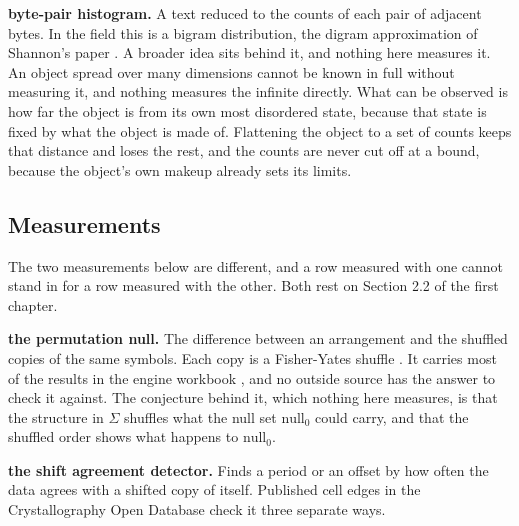 \noindent\textbf{byte-pair histogram.} A text reduced to the counts of each pair of adjacent bytes. In the field this is a bigram distribution, the digram approximation of Shannon's paper \cite{src:Shannon}. A broader idea sits behind it, and nothing here measures it. An object spread over many dimensions cannot be known in full without measuring it, and nothing measures the infinite directly. What can be observed is how far the object is from its own most disordered state, because that state is fixed by what the object is made of. Flattening the object to a set of counts keeps that distance and loses the rest, and the counts are never cut off at a bound, because the object's own makeup already sets its limits.

\subsection{Measurements}

\enlargethispage{4\baselineskip}

The two measurements below are different, and a row measured with one cannot stand in for a row measured with the other. Both rest on Section 2.2 of the first chapter.

\noindent\textbf{the permutation null.} The difference between an arrangement and the shuffled copies of the same symbols. Each copy is a Fisher-Yates shuffle \cite{src:Fisher}. It carries most of the results in the engine workbook \cite{src:Quigg-orior-workbook}, and no outside source has the answer to check it against. The conjecture behind it, which nothing here measures, is that the structure in \(\Sigma\) shuffles what the null set \(\text{null}_0\) could carry, and that the shuffled order shows what happens to \(\text{null}_0\).

\noindent\textbf{the shift agreement detector.} Finds a period or an offset by how often the data agrees with a shifted copy of itself. Published cell edges in the Crystallography Open Database \cite{src:Crystallography-Open-Database} check it three separate ways.
